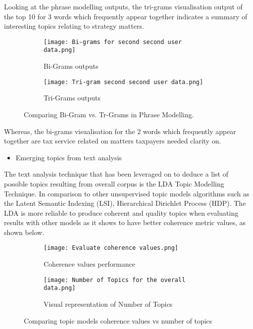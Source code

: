 Looking at the phrase modelling outputs, the tri-grams visualisation output of the top 10 for 3 words which frequently appear together indicates a summary of interesting topics relating to strategy matters.

\begin{figure}
      \centering
	    \begin{subfigure}{0.25\linewidth}
		\texttt{[image: Bi-grams for second second user data.png]}
		\caption{Bi-Grams outputs}
		\label{fig: Associated Bi-Grams Outputs}
	   \end{subfigure}
	   \begin{subfigure}{0.25\linewidth}
		\texttt{[image: Tri-gram second second user data.png]}
		\caption{Tri-Grams outputs}
		\label{fig:Associated Tri-Gram Outputs}
	    \end{subfigure}
	   \vfill
	 \caption{Comparing Bi-Gram vs. Tr-Grams in Phrase Modelling.}
\end{figure}

Whereas, the bi-grams visualisation for the 2 words which frequently appear together are tax service related on matters taxpayers needed clarity on.

\begin{itemize}
    \item Emerging topics from text analysis
\end{itemize}

The text analysis technique that has been leveraged on to deduce a list of possible topics resulting from overall corpus is the LDA Topic Modelling Technique.  In comparison to other unsupervised topic models algorithms such as the Latent Semantic Indexing (LSI), Hierarchical Dirichlet Process (HDP).  The LDA is more reliable to produce coherent and quality topics when evaluating results with other models as it shows to have better coherence metric values, as shown below.\\

\begin{figure}
      \centering
	    \begin{subfigure}{0.25\linewidth}
		\texttt{[image: Evaluate coherence values.png]}
		\caption{Coherence values performance }
		\label{fig: Coherence Values}
	   \end{subfigure}
	   \begin{subfigure}{0.25\linewidth}
		\texttt{[image: Number of Topics for the overall data.png]}
		\caption{Visual representation of Number of Topics}
		\label{fig:Number of Topics selection}
	    \end{subfigure}
	   \vfill
	 \caption{Comparing topic models coherence values vs  number of topics}
\end{figure}

